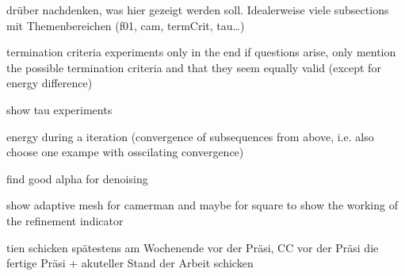 \begin{frame}
  drüber nachdenken, was hier gezeigt werden soll. Idealerweise viele 
  subsections mit Themenbereichen (f01, cam, termCrit, tau\ldots)

  termination criteria experiments only in the end if questions arise, only
  mention the possible termination criteria and that they seem equally valid
  (except for energy difference)

  show tau experiments

  energy during a iteration (convergence of subsequences from above, i.e.
  also choose one exampe with osscilating convergence)

  find good alpha for denoising

  show adaptive mesh for camerman and maybe for square to show the working
  of the refinement indicator
\end{frame}

\begin{frame}
  tien schicken spätestens am Wochenende vor der Präsi, CC vor der Präsi
  die fertige Präsi + akuteller Stand der Arbeit schicken
\end{frame}
